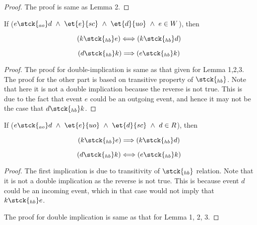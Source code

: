     \begin{proof}
        
        The proof is same as Lemma 2. 
    \end{proof}
    
    \begin{lemma}
    
        If ($e \stck{_{ao}} d \ \wedge \ \et{e}{sc} \ \wedge \ 
                \et{d}{uo} \ \wedge \  
                e \in W $), then
                
                \[
                    (k \stck{_{hb}} e) 
                    \Longleftrightarrow
                    (k \stck{_{hb}} d) 
                \]
                
                \[
                    (d \stck{_{hb}} k) 
                    \Longrightarrow
                    (e \stck{_{hb}} k) 
                \]
    
    \end{lemma}
    
    \begin{proof}
    
        The proof for double-implication is same as that given for Lemma 1,2,3. The proof for the other part is based on transitive property of $\stck{_{hb}}$. Note that here it is not a double implication because the reverse is not true. This is due to the fact that event $e$ could be an outgoing event, and hence it may not be the case that $d \stck{_{hb}} k$.
        
    \end{proof}
    
    \begin{lemma}
    
        If ($e \stck{_{ao}} d \ \wedge \ \et{e}{uo} \ \wedge \ 
                \et{d}{sc} \ \wedge \  
                d \in R $), then
                
                \[
                    (k \stck{_{hb}} e) 
                    \Longrightarrow
                    (k \stck{_{hb}} d) 
                \]
                
                \[
                    (d \stck{_{hb}} k) 
                    \Longleftrightarrow
                    (e \stck{_{hb}} k) 
                \]
    
    \end{lemma}
    
    \begin{proof}
    
        The first implication is due to transitivity of $\stck{_{hb}}$ relation. Note that it is not a double implication as the reverse is not true. This is because event $d$ could be an incoming event, which in that case would not imply that $k \stck{_{hb}} e$. 
        
        The proof for double implication is same as that for Lemma 1, 2, 3. 
    
    \end{proof}
    